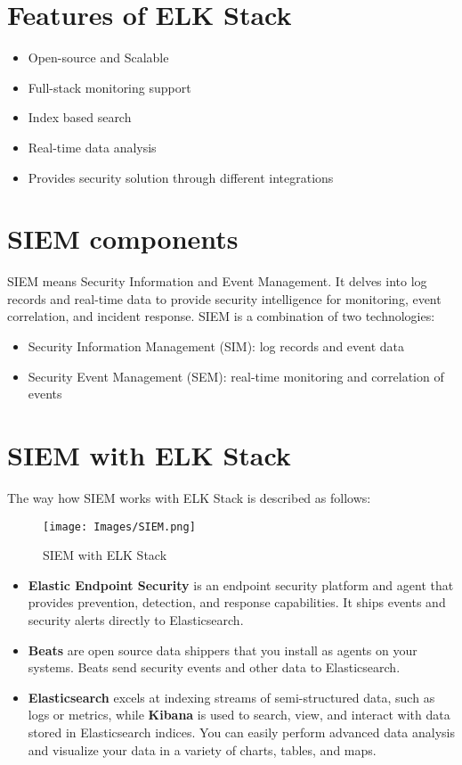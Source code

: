 \documentclass{report}
\begin{document}
\section{Features of ELK Stack}
\begin{itemize}
	\item Open-source and Scalable
	\item Full-stack monitoring support
	\item Index based search
	\item Real-time data analysis
	\item Provides security solution through different integrations
\end{itemize}

\section{SIEM components}
SIEM means Security Information and Event Management. It delves into log records and real-time data to 
provide security intelligence for monitoring, event correlation, and incident response. SIEM is a combination of two technologies:
\begin{itemize}
	\item Security Information Management (SIM): log records and event data
	\item Security Event Management (SEM): real-time monitoring and correlation of events
\end{itemize}

\section{SIEM with ELK Stack}
The way how SIEM works with ELK Stack is described as follows:
\begin{figure}[ht]
	\centering
	\texttt{[image: Images/SIEM.png]}
	\caption{SIEM with ELK Stack}
	\label{fig:SIEM with ELK Stack}
\end{figure}

\begin{itemize}
	\item \textbf{Elastic Endpoint Security} is an endpoint security platform and agent that provides prevention, detection, 
	and response capabilities. It ships events and security alerts directly to Elasticsearch.
	\item \textbf{Beats} are open source data shippers that you install as agents on your systems. 
	Beats send security events and other data to Elasticsearch.
	\item \textbf{Elasticsearch} excels at indexing streams of semi-structured data, 
	such as logs or metrics, while \textbf{Kibana} is used to search, view, and interact with data stored in Elasticsearch indices. 
	You can easily perform advanced data analysis and visualize your data in a variety of charts, tables, and maps.
\end{itemize}
\end{document}
